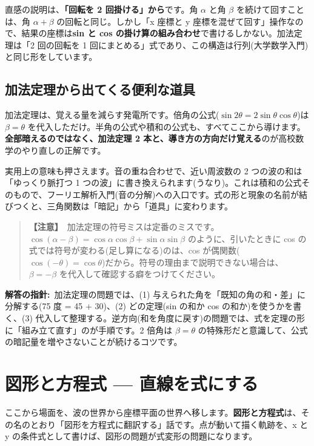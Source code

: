 \documentclass{article}
\begin{document}
直感の説明は、\textbf{「回転を 2 回掛ける」から}です。角 \( \alpha \) と角 \( \beta \) を続けて回すことは、角 \( \alpha + \beta \) の回転と同じ。しかし「x 座標と y 座標を混ぜて回す」操作なので、結果の座標は\textbf{sin と cos の掛け算の組み合わせ}で書けるしかない。加法定理は「2 回の回転を 1 回にまとめる」式であり、この構造は行列(大学数学入門)と同じ形をしています。

\subsection{加法定理から出てくる便利な道具}

加法定理は、覚える量を減らす発電所です。倍角の公式(\( \sin 2\theta = 2\sin\theta\cos\theta \))は \( \beta = \theta \) を代入しただけ。半角の公式や積和の公式も、すべてここから導けます。\textbf{全部暗えるのではなく、加法定理 2 本と、導き方の方向だけ覚える}のが高校数学のやり直しの正解です。

実用上の意味も押さえます。音の重ね合わせで、近い周波数の 2 つの波の和は「ゆっくり脈打つ 1 つの波」に書き換えられます(うなり)。これは積和の公式そのもので、フーリエ解析入門(音の分解)への入口です。式の形と現象の名前が結びつくと、三角関数は「暗記」から「道具」に変わります。

\begin{quote}
\textbf{【注意】}\ 加法定理の符号ミスは定番のミスです。\( \cos(\alpha - \beta) = \cos\alpha\cos\beta + \sin\alpha\sin\beta \) のように、引いたときに cos の式では符号が変わる(足し算になる)のは、cos が偶関数(\( \cos(-\theta) = \cos\theta \))だから。符号の理由まで説明できない場合は、\( \beta = -\beta \) を代入して確認する癖をつけてください。
\end{quote}

\textbf{解答の指針:}\ 加法定理の問題では、(1) 与えられた角を「既知の角の和・差」に分解する(75 度 = 45 + 30)、(2) どの定理(sin の和か cos の和か)を使うかを書く、(3) 代入して整理する。逆方向(和を角度に戻す)の問題では、式を定理の形に「組み立て直す」のが手順です。2 倍角は \( \beta = \theta \) の特殊形だと意識して、公式の暗記量を増やさないことが続けるコツです。

\section{図形と方程式 — 直線を式にする}

ここから場面を、波の世界から座標平面の世界へ移します。\textbf{図形と方程式}は、その名のとおり「図形を方程式に翻訳する」話です。点が動いて描く軌跡を、x と y の条件式として書けば、図形の問題が式変形の問題になります。
\end{document}
